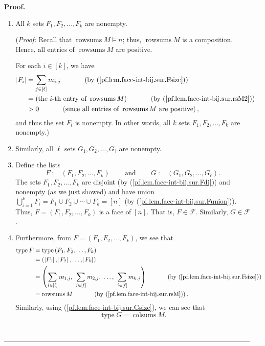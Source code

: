 \documentclass[12pt]{article}
\theoremstyle{definition}%
\theoremstyle{definition}%
\theoremstyle{remark}%
\newcommand{\interval}[1]{\left[ #1 \right]} %
\newcommand{\CF}{\mathcal{F}}
\newcommand{\rowsums}{\operatorname{rowsums}}
\newcommand{\colsums}{\operatorname{colsums}}
\newcommand{\type}{\operatorname{type}}
\newenvironment{proof}[1][Proof]{\noindent\textbf{#1.} }{\ \rule{0.5em}{0.5em}}
\begin{document}
\begin{proof}
\begin{enumerate}
\item All $k$ sets $F_{1},F_{2},\ldots,F_{k}$ are nonempty.

(\textit{Proof:} Recall that $\rowsums M\models n$; thus,
$\rowsums M$ is a composition. Hence, all entries of
$\rowsums M$ are positive.

For each $i\in\interval{k}  $, we have
\begin{align*}
\left\vert F_{i}\right\vert  & =\sum_{j\in\interval{\ell}}
m_{i,j}\ \ \ \ \ \ \ \ \ \ \left(  \text{by
(\ref{pf.lem.face-int-bij.sur.Fsize})}\right)  \\
& =\left(  \text{the }i\text{-th entry of }\rowsums M\right)
\ \ \ \ \ \ \ \ \ \ \left(
\text{by (\ref{pf.lem.face-int-bij.sur.rsM2})}\right)  \\
& >0\ \ \ \ \ \ \ \ \ \ \left(  \text{since all entries of }
\rowsums M\text{ are positive}\right)  ,
\end{align*}
and thus the set $F_{i}$ is nonempty. In other words, all $k$ sets
$F_{1},F_{2},\ldots,F_{k}$ are nonempty.)

\item Similarly, all $\ell$ sets $G_{1},G_{2},\ldots,G_{\ell}$ are nonempty.

\item Define the lists
\[
F:=\left(  F_{1},F_{2},\ldots,F_{k}\right)  \ \ \ \ \ \ \ \ \ \ \text{and}
\ \ \ \ \ \ \ \ \ \ G:=\left(  G_{1},G_{2},\ldots,G_{\ell}\right)  .
\]
The sets $F_{1},F_{2},\ldots,F_{k}$ are disjoint (by
(\ref{pf.lem.face-int-bij.sur.Fdj})) and nonempty (as we just showed) and have
union $\bigcup_{i=1}^{k}F_{i}=F_{1}\cup F_{2}\cup\cdots\cup F_{k}=
\interval{n}$ (by (\ref{pf.lem.face-int-bij.sur.Funion})). Thus, $F=\left(
F_{1},F_{2},\ldots,F_{k}\right)  $ is a face of $\interval{n}$. That is,
$F\in\CF $. Similarly, $G\in\CF $.

\item Furthermore, from $F=\left(  F_{1},F_{2},\ldots,F_{k}\right)  $, we see
that
\begin{align*}
\type F &  =\type \left(  F_{1},F_{2},\ldots
,F_{k}\right)  \\
&  =\left(  \left\vert F_{1}\right\vert ,\left\vert F_{2}\right\vert
,\ldots,\left\vert F_{k}\right\vert \right)  \\
&  =\left(  \sum_{j\in\interval{\ell}}m_{1,j},\ \sum_{j\in
\interval{\ell}}m_{2,j},\ \ldots,\ \sum_{j\in\interval{\ell}}
m_{k,j}\right)  \ \ \ \ \ \ \ \ \ \ \left(  \text{by
(\ref{pf.lem.face-int-bij.sur.Fsize})}\right)  \\
&  =\rowsums M\ \ \ \ \ \ \ \ \ \ \left(  \text{by
(\ref{pf.lem.face-int-bij.sur.rsM})}\right)  .
\end{align*}
Similarly, using (\ref{pf.lem.face-int-bij.sur.Gsize}), we can see that
\[
\type G=\colsums M.
\]



\end{enumerate}
\end{proof}
\end{document}
